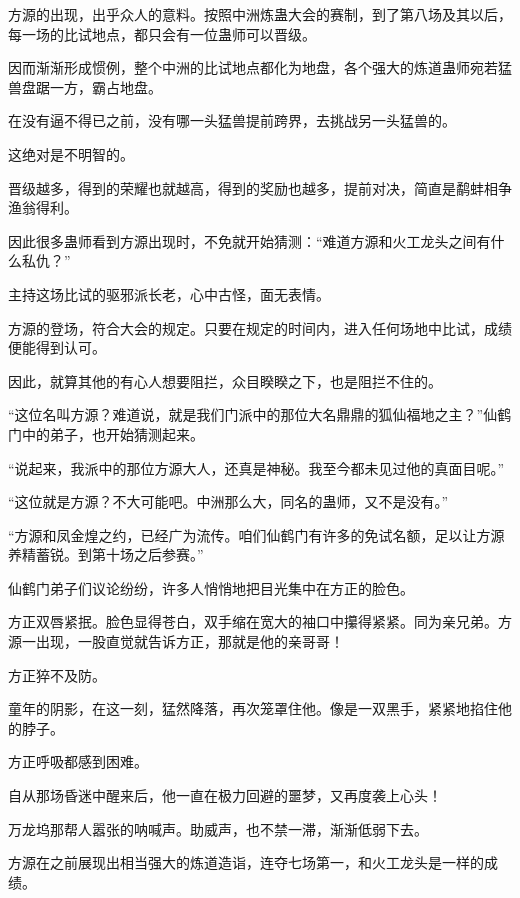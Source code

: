 
\begin{this_body}



方源的出现，出乎众人的意料。按照中洲炼蛊大会的赛制，到了第八场及其以后，每一场的比试地点，都只会有一位蛊师可以晋级。

因而渐渐形成惯例，整个中洲的比试地点都化为地盘，各个强大的炼道蛊师宛若猛兽盘踞一方，霸占地盘。

在没有逼不得已之前，没有哪一头猛兽提前跨界，去挑战另一头猛兽的。

这绝对是不明智的。

晋级越多，得到的荣耀也就越高，得到的奖励也越多，提前对决，简直是鹬蚌相争渔翁得利。

因此很多蛊师看到方源出现时，不免就开始猜测：“难道方源和火工龙头之间有什么私仇？”

主持这场比试的驱邪派长老，心中古怪，面无表情。

方源的登场，符合大会的规定。只要在规定的时间内，进入任何场地中比试，成绩便能得到认可。

因此，就算其他的有心人想要阻拦，众目睽睽之下，也是阻拦不住的。

“这位名叫方源？难道说，就是我们门派中的那位大名鼎鼎的狐仙福地之主？”仙鹤门中的弟子，也开始猜测起来。

“说起来，我派中的那位方源大人，还真是神秘。我至今都未见过他的真面目呢。”

“这位就是方源？不大可能吧。中洲那么大，同名的蛊师，又不是没有。”

“方源和凤金煌之约，已经广为流传。咱们仙鹤门有许多的免试名额，足以让方源养精蓄锐。到第十场之后参赛。”

仙鹤门弟子们议论纷纷，许多人悄悄地把目光集中在方正的脸色。

方正双唇紧抿。脸色显得苍白，双手缩在宽大的袖口中攥得紧紧。同为亲兄弟。方源一出现，一股直觉就告诉方正，那就是他的亲哥哥！

方正猝不及防。

童年的阴影，在这一刻，猛然降落，再次笼罩住他。像是一双黑手，紧紧地掐住他的脖子。

方正呼吸都感到困难。

自从那场昏迷中醒来后，他一直在极力回避的噩梦，又再度袭上心头！

万龙坞那帮人嚣张的呐喊声。助威声，也不禁一滞，渐渐低弱下去。

方源在之前展现出相当强大的炼道造诣，连夺七场第一，和火工龙头是一样的成绩。


\end{this_body}

